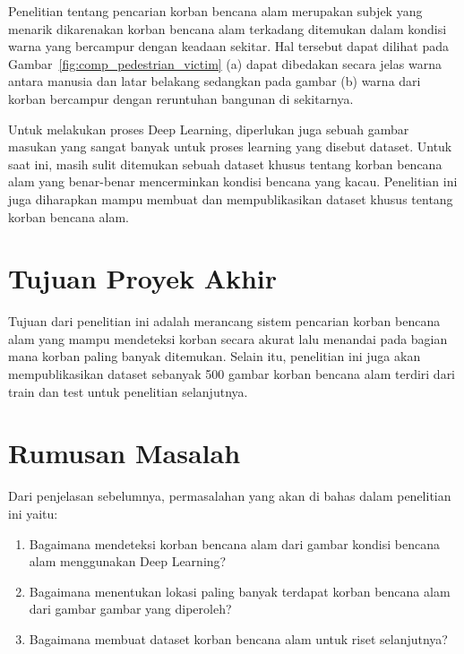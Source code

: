 Penelitian tentang pencarian korban bencana alam merupakan subjek yang menarik dikarenakan korban bencana alam terkadang ditemukan dalam kondisi warna yang bercampur dengan keadaan sekitar. Hal tersebut dapat dilihat pada Gambar~\ref{fig:comp_pedestrian_victim} (a) dapat dibedakan secara jelas warna antara manusia dan latar belakang sedangkan pada gambar (b) warna dari korban bercampur dengan reruntuhan bangunan di sekitarnya.


Untuk melakukan proses Deep Learning, diperlukan juga sebuah gambar masukan yang sangat banyak untuk proses learning yang disebut dataset. Untuk saat ini, masih sulit ditemukan sebuah dataset khusus tentang korban bencana alam yang benar-benar mencerminkan kondisi bencana yang kacau. Penelitian ini juga diharapkan mampu membuat dan mempublikasikan dataset khusus tentang korban bencana alam.                                                  


\section{Tujuan Proyek Akhir} %

Tujuan dari penelitian ini adalah merancang sistem pencarian korban bencana alam yang mampu mendeteksi korban secara akurat lalu menandai pada bagian mana korban paling banyak ditemukan. Selain itu, penelitian ini juga akan mempublikasikan dataset sebanyak 500 gambar korban bencana alam terdiri dari train dan test untuk penelitian selanjutnya.

\section{Rumusan Masalah}  %
\label{section1.3}

Dari penjelasan sebelumnya, permasalahan yang akan di bahas dalam penelitian ini yaitu:
\begin{enumerate}
 \item Bagaimana mendeteksi korban bencana alam dari gambar kondisi bencana alam menggunakan Deep Learning?
 \item Bagaimana menentukan lokasi paling banyak terdapat korban bencana alam dari gambar gambar yang diperoleh?
 \item Bagaimana membuat dataset korban bencana alam untuk riset selanjutnya?
\end{enumerate}

